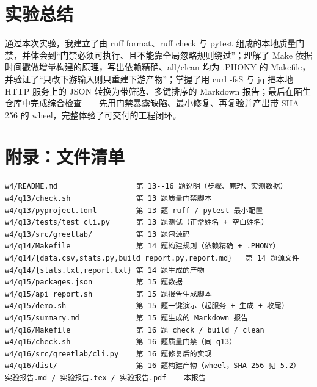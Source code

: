 \documentclass[UTF8,fontset=ubuntu]{ctexart}
\begin{document}
\section{实验总结}
通过本次实验，我建立了由 ruff format、ruff check 与 pytest 组成的本地质量门禁，并体会到“门禁必须可执行、且不能靠全局忽略规则绕过”；理解了 Make 依据时间戳做增量构建的原理，写出依赖精确、all/clean 均为 .PHONY 的 Makefile，并验证了“只改下游输入则只重建下游产物”；掌握了用 curl -fsS 与 jq 把本地 HTTP 服务上的 JSON 转换为带筛选、多键排序的 Markdown 报告；最后在陌生仓库中完成综合检查——先用门禁暴露缺陷、最小修复、再复验并产出带 SHA-256 的 wheel，完整体验了可交付的工程闭环。

\section*{附录：文件清单}
\begin{lstlisting}
w4/README.md                  第 13--16 题说明（步骤、原理、实测数据）
w4/q13/check.sh               第 13 题质量门禁脚本
w4/q13/pyproject.toml         第 13 题 ruff / pytest 最小配置
w4/q13/tests/test_cli.py      第 13 题测试（正常姓名 + 空白姓名）
w4/q13/src/greetlab/          第 13 题包源码
w4/q14/Makefile               第 14 题构建规则（依赖精确 + .PHONY）
w4/q14/{data.csv,stats.py,build_report.py,report.md}   第 14 题源文件
w4/q14/{stats.txt,report.txt} 第 14 题生成的产物
w4/q15/packages.json          第 15 题数据
w4/q15/api_report.sh          第 15 题报告生成脚本
w4/q15/demo.sh                第 15 题一键演示（起服务 + 生成 + 收尾）
w4/q15/summary.md             第 15 题生成的 Markdown 报告
w4/q16/Makefile               第 16 题 check / build / clean
w4/q16/check.sh               第 16 题质量门禁（同 q13）
w4/q16/src/greetlab/cli.py    第 16 题修复后的实现
w4/q16/dist/                  第 16 题构建产物（wheel，SHA-256 见 5.2）
实验报告.md / 实验报告.tex / 实验报告.pdf    本报告
\end{lstlisting}
\end{document}
